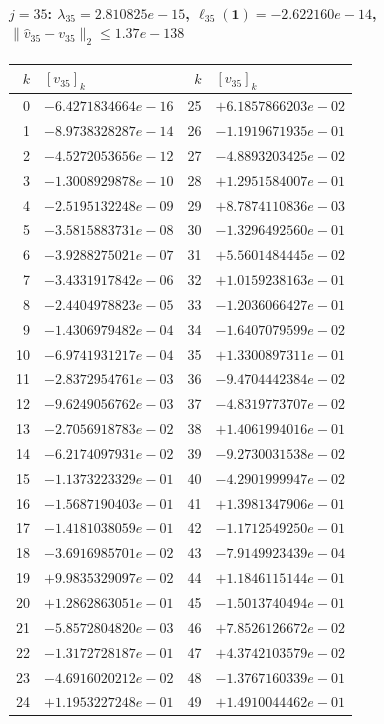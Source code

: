 \documentclass[11pt]{article}
\begin{document}
\paragraph{$j = 35$: $\lambda_{35} = 2.810825e-15$, \quad $\ell_{35}(\mathbf{1}) = -2.622160e-14$, \quad $\|\hat{v}_{35} - v_{35}\|_2 \leq 1.37e-138$}
\begin{center}
{\footnotesize
\begin{tabular}{r@{\;\;}l@{\quad}r@{\;\;}l}
\toprule
$k$ & $[v_{35}]_k$ & $k$ & $[v_{35}]_k$ \\
\midrule
0 & $-6.4271834664e-16$ & 25 & $+6.1857866203e-02$ \\
1 & $-8.9738328287e-14$ & 26 & $-1.1919671935e-01$ \\
2 & $-4.5272053656e-12$ & 27 & $-4.8893203425e-02$ \\
3 & $-1.3008929878e-10$ & 28 & $+1.2951584007e-01$ \\
4 & $-2.5195132248e-09$ & 29 & $+8.7874110836e-03$ \\
5 & $-3.5815883731e-08$ & 30 & $-1.3296492560e-01$ \\
6 & $-3.9288275021e-07$ & 31 & $+5.5601484445e-02$ \\
7 & $-3.4331917842e-06$ & 32 & $+1.0159238163e-01$ \\
8 & $-2.4404978823e-05$ & 33 & $-1.2036066427e-01$ \\
9 & $-1.4306979482e-04$ & 34 & $-1.6407079599e-02$ \\
10 & $-6.9741931217e-04$ & 35 & $+1.3300897311e-01$ \\
11 & $-2.8372954761e-03$ & 36 & $-9.4704442384e-02$ \\
12 & $-9.6249056762e-03$ & 37 & $-4.8319773707e-02$ \\
13 & $-2.7056918783e-02$ & 38 & $+1.4061994016e-01$ \\
14 & $-6.2174097931e-02$ & 39 & $-9.2730031538e-02$ \\
15 & $-1.1373223329e-01$ & 40 & $-4.2901999947e-02$ \\
16 & $-1.5687190403e-01$ & 41 & $+1.3981347906e-01$ \\
17 & $-1.4181038059e-01$ & 42 & $-1.1712549250e-01$ \\
18 & $-3.6916985701e-02$ & 43 & $-7.9149923439e-04$ \\
19 & $+9.9835329097e-02$ & 44 & $+1.1846115144e-01$ \\
20 & $+1.2862863051e-01$ & 45 & $-1.5013740494e-01$ \\
21 & $-5.8572804820e-03$ & 46 & $+7.8526126672e-02$ \\
22 & $-1.3172728187e-01$ & 47 & $+4.3742103579e-02$ \\
23 & $-4.6916020212e-02$ & 48 & $-1.3767160339e-01$ \\
24 & $+1.1953227248e-01$ & 49 & $+1.4910044462e-01$ \\
\bottomrule
\end{tabular}
}
\end{center}
\end{document}
